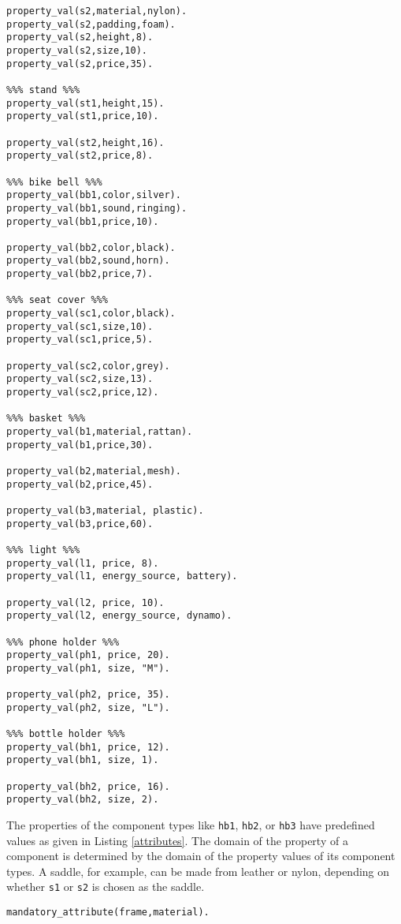 \begin{lstlisting}[caption = {Attribute Definition}, basicstyle=\ttfamily, label = {attributes}]
property_val(s2,material,nylon).
property_val(s2,padding,foam).
property_val(s2,height,8).
property_val(s2,size,10).
property_val(s2,price,35).

%%% stand %%%
property_val(st1,height,15).
property_val(st1,price,10).

property_val(st2,height,16).
property_val(st2,price,8).

%%% bike bell %%%
property_val(bb1,color,silver).
property_val(bb1,sound,ringing).
property_val(bb1,price,10).

property_val(bb2,color,black).
property_val(bb2,sound,horn).
property_val(bb2,price,7).

%%% seat cover %%%
property_val(sc1,color,black).
property_val(sc1,size,10).
property_val(sc1,price,5).

property_val(sc2,color,grey).
property_val(sc2,size,13).
property_val(sc2,price,12).

%%% basket %%%
property_val(b1,material,rattan).
property_val(b1,price,30).

property_val(b2,material,mesh).
property_val(b2,price,45).

property_val(b3,material, plastic).
property_val(b3,price,60).

%%% light %%%
property_val(l1, price, 8).
property_val(l1, energy_source, battery).

property_val(l2, price, 10).
property_val(l2, energy_source, dynamo).

%%% phone holder %%%
property_val(ph1, price, 20).
property_val(ph1, size, "M").

property_val(ph2, price, 35).
property_val(ph2, size, "L").

%%% bottle holder %%%
property_val(bh1, price, 12).
property_val(bh1, size, 1).

property_val(bh2, price, 16).
property_val(bh2, size, 2).

\end{lstlisting} 

The properties of the component types like \texttt{hb1}, \texttt{hb2}, or \texttt{hb3} have predefined values as given in Listing \ref{attributes}. 
The domain of the property of a component is determined by the domain of the property values of its component types.
A saddle, for example, can be made from leather or nylon, depending on whether \texttt{s1} or \texttt{s2} is chosen as the saddle. 

\begin{lstlisting}[caption = {Mandatory Attributes}, label = {mandatory}]
mandatory_attribute(frame,material).
\end{lstlisting}

